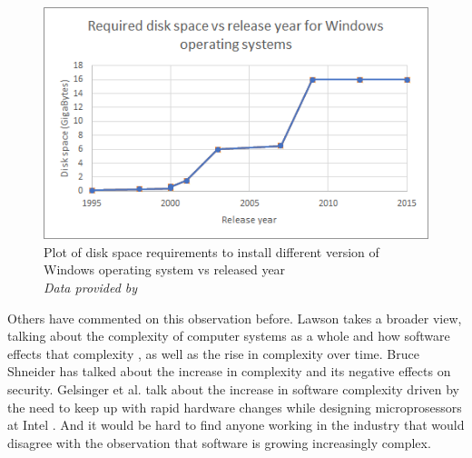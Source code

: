 \begin{figure} \begin{center}
\includegraphics[width=0.8\linewidth]{pics/windows_year_size_plot} 
\end{center} 
\caption{Plot of disk space requirements to install different version of Windows operating system vs released year\\ \textit{\small{Data provided by \cite{comp_win}}}}
\label{win_year_size_plot}
\end{figure}

Others have commented on this observation before. Lawson takes a broader view, talking about the complexity of computer systems as a whole and how software effects that complexity \cite{lawson}, as well as the rise in complexity over time. Bruce Shneider has talked about the increase in complexity and its negative effects on security. Gelsinger et al. talk about the increase in software complexity driven by the need to keep up with rapid hardware changes while designing microprosessors at Intel \cite{gelsinger}. And it would be hard to find anyone working in the industry that would disagree with the observation that software is growing increasingly complex.\\

